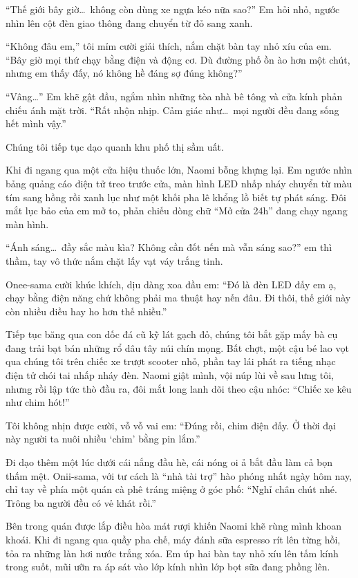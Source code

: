 \documentclass[../main.tex]{subfiles}
\begin{document}
``Thế giới bây giờ\dots\ không còn dùng xe ngựa kéo nữa sao?'' Em hỏi nhỏ, ngước nhìn lên cột đèn giao thông đang chuyển từ đỏ sang xanh.

``Không đâu em,'' tôi mỉm cười giải thích, nắm chặt bàn tay nhỏ xíu của em. ``Bây giờ mọi thứ chạy bằng điện và động cơ. Dù đường phố ồn ào hơn một chút, nhưng em thấy đấy, nó không hề đáng sợ đúng không?''

``Vâng\dots'' Em khẽ gật đầu, ngắm nhìn những tòa nhà bê tông và cửa kính phản chiếu ánh mặt trời. ``Rất nhộn nhịp. Cảm giác như\dots\ mọi người đều đang sống hết mình vậy.''

Chúng tôi tiếp tục dạo quanh khu phố thị sầm uất.

Khi đi ngang qua một cửa hiệu thuốc lớn, Naomi bỗng khựng lại. Em ngước nhìn bảng quảng cáo điện tử treo trước cửa, màn hình LED nhấp nháy chuyển từ màu tím sang hồng rồi xanh lục như một khối pha lê khổng lồ biết tự phát sáng. Đôi mắt lục bảo của em mở to, phản chiếu dòng chữ ``Mở cửa 24h'' đang chạy ngang màn hình.

``Ánh sáng\dots\ đầy sắc màu kìa? Không cần đốt nến mà vẫn sáng sao?'' em thì thầm, tay vô thức nắm chặt lấy vạt váy trắng tinh.

Onee-sama cười khúc khích, dịu dàng xoa đầu em: ``Đó là đèn LED đấy em ạ, chạy bằng điện năng chứ không phải ma thuật hay nến đâu. Đi thôi, thế giới này còn nhiều điều hay ho hơn thế nhiều.''

Tiếp tục băng qua con dốc đá cũ kỹ lát gạch đỏ, chúng tôi bắt gặp mấy bà cụ đang trải bạt bán những rổ dâu tây núi chín mọng. Bất chợt, một cậu bé lao vọt qua chúng tôi trên chiếc xe trượt scooter nhỏ, phần tay lái phát ra tiếng nhạc điện tử chói tai nhấp nháy đèn. Naomi giật mình, vội núp lùi về sau lưng tôi, nhưng rồi lập tức thò đầu ra, đôi mắt long lanh dõi theo cậu nhóc: ``Chiếc xe kêu như chim hót!''

Tôi không nhịn được cười, vỗ vỗ vai em: ``Đúng rồi, chim điện đấy. Ở thời đại này người ta nuôi nhiều `chim' bằng pin lắm.''

Đi dạo thêm một lúc dưới cái nắng đầu hè, cái nóng oi ả bắt đầu làm cả bọn thấm mệt. Onii-sama, với tư cách là ``nhà tài trợ'' hào phóng nhất ngày hôm nay, chỉ tay về phía một quán cà phê tráng miệng ở góc phố: ``Nghỉ chân chút nhé. Trông ba người đều có vẻ khát rồi.''

Bên trong quán được lắp điều hòa mát rượi khiến Naomi khẽ rùng mình khoan khoái. Khi đi ngang qua quầy pha chế, máy đánh sữa espresso rít lên từng hồi, tỏa ra những làn hơi nước trắng xóa. Em úp hai bàn tay nhỏ xíu lên tấm kính trong suốt, mũi ưỡn ra áp sát vào lớp kính nhìn lớp bọt sữa đang phồng lên.
\end{document}
